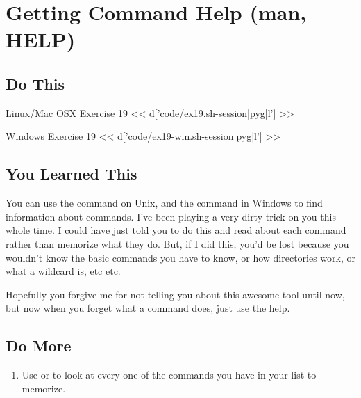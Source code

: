 \chapter{Getting Command Help (man, HELP)}

\section{Do This}

\begin{code}{Linux/Mac OSX Exercise 19}
<< d['code/ex19.sh-session|pyg|l'] >>
\end{code}

\begin{code}{Windows Exercise 19}
<< d['code/ex19-win.sh-session|pyg|l'] >>
\end{code}

\section{You Learned This}

You can use the  command on Unix, and the  command
in Windows to find information about commands.  I've been playing a very dirty
trick on you this whole time.  I could have just told you to do this and read
about each command rather than memorize what they do.  But, if I did this, you'd
be lost because you wouldn't know the basic commands you have to know, or how
directories work, or what a wildcard is, etc etc.

Hopefully you forgive me for not telling you about this awesome tool until now,
but now when you forget what a command does, just use the help.

\section{Do More}

\begin{enumerate}
\item Use  or  to look at every one of the commands you have in your list to memorize.
\end{enumerate}

